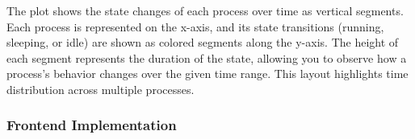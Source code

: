 \documentclass[12pt]{article}
\begin{document}
 The plot shows the state changes of each process over time as vertical segments. Each process is represented on the x-axis, and its state transitions (running, sleeping, or idle) are shown as colored segments along the y-axis. The height of each segment represents the duration of the state, allowing you to observe how a process's behavior changes over the given time range. This layout highlights time distribution across multiple processes.

\subsubsection{Frontend Implementation}











\end{document}
